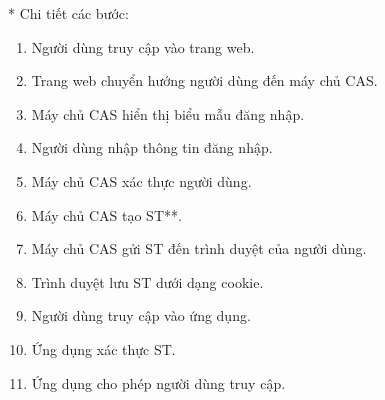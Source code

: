 \documentclass[a4paper]{article}
\begin{document}
* Chi tiết các bước:
\begin{enumerate}
    \item Người dùng truy cập vào trang web.
    \item Trang web chuyển hướng người dùng đến máy chủ CAS.
    \item Máy chủ CAS hiển thị biểu mẫu đăng nhập.
    \item Người dùng nhập thông tin đăng nhập.
    \item Máy chủ CAS xác thực người dùng.
    \item Máy chủ CAS tạo ST**.
    \item Máy chủ CAS gửi ST đến trình duyệt của người dùng.
    \item Trình duyệt lưu ST dưới dạng cookie.
    \item Người dùng truy cập vào ứng dụng.
    \item Ứng dụng xác thực ST.
    \item Ứng dụng cho phép người dùng truy cập.
\end{enumerate}
\newpage
\end{document}
